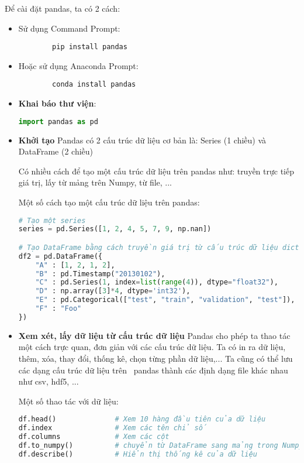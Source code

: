 \documentclass[../main-report.tex]{subfiles}
\begin{document}
Để cài đặt pandas, ta có 2 cách:
\begin{itemize}
    \item Sử dụng Command Prompt: 
    \begin{lstlisting}
        pip install pandas
    \end{lstlisting}
    \item Hoặc sử dụng Anaconda Prompt:
    \begin{lstlisting}
        conda install pandas
    \end{lstlisting}
\end{itemize}

\begin{itemize}
\item \textbf{Khai báo thư viện}: 
\begin{lstlisting}[language=Python] 
import pandas as pd
\end{lstlisting}

\item \textbf{Khởi tạo}
Pandas có 2 cấu trúc dữ liệu cơ bản là: Series (1 chiều) và DataFrame (2
chiều)

Có nhiều cách để tạo một cấu trúc dữ liệu trên pandas như: truyền trực tiếp giá trị, lấy từ mảng trên Numpy, từ file, ...

\begin{example}
Một số cách tạo một cấu trúc dữ liệu trên pandas:
\begin{lstlisting}[language=Python]
# Tạo một series
series = pd.Series([1, 2, 4, 5, 7, 9, np.nan])

# Tạo DataFrame bằng cách truyền giá trị từ cấu trúc dữ liệu dictionary trong python
df2 = pd.DataFrame({
    "A" : [1, 2, 1, 2],
    "B" : pd.Timestamp("20130102"),
    "C" : pd.Series(1, index=list(range(4)), dtype="float32"),
    "D" : np.array([3]*4, dtype='int32'),
    "E" : pd.Categorical(["test", "train", "validation", "test"]),
    "F" : "Foo"
})
\end{lstlisting}
\end{example}

\item \textbf{Xem xét, lấy dữ liệu từ cấu trúc dữ liệu}
Pandas cho phép ta thao tác một cách trực quan, đơn giản với các cấu trúc dữ liệu. Ta có in ra dữ liệu, thêm, xóa, thay đổi, thống kê, chọn từng phần dữ liệu,... Ta cũng có thể lưu các dạng cấu trúc dữ liệu trên \
pandas thành các định dạng file khác nhau như csv, hdf5, ...

\begin{example}
Một số thao tác với dữ liệu:
\begin{lstlisting}[language=Python]
df.head()              # Xem 10 hàng đầu tiên của dữ liệu
df.index               # Xem các tên chỉ số 
df.columns             # Xem các cột
df.to_numpy()          # chuyển từ DataFrame sang mảng trong Numpy
df.describe()          # Hiển thị thống kê của dữ liệu
\end{lstlisting}
\end{example}
\end{itemize}
\end{document}
